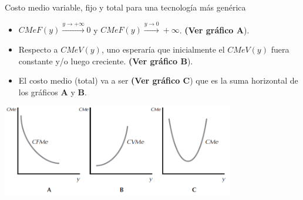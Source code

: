 \documentclass{beamer}
\theoremstyle{definition}
\begin{document}
\begin{frame}{\small Costo medio variable, fijo y total para una tecnología más genérica}
\begin{itemize}
\item  $CMeF\left( y\right)\xrightarrow{y\to +\infty} 0$ y $CMeF\left( y\right)\xrightarrow{y\to 0} +\infty$. \textbf{(Ver gráfico A}). 
\item Respecto a $CMeV\left(y\right) $, uno esperaría que inicialmente el $CMeV(y)$ fuera constante y/o luego creciente. \textbf{(Ver gráfico B}). 

\item El costo medio (total) va a ser \textbf{(Ver gráfico C}) que es la suma horizontal de los gráficos \textbf{A} y \textbf{B}.
\end{itemize}

	\begin{center}
\includegraphics[width=4in]{figures4/costos.png}
\end{center}
\end{frame}
\end{document}
